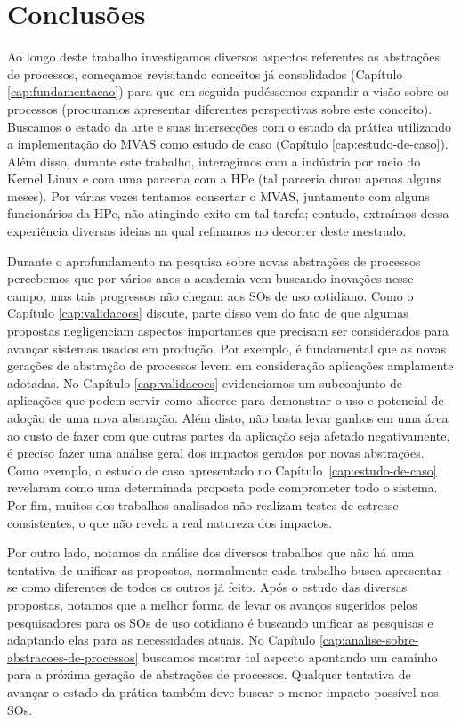 \chapter{Conclusões}
\label{cap:conclusoes}

Ao longo deste trabalho investigamos diversos aspectos referentes as abstrações
de processos, começamos revisitando conceitos já consolidados (Capítulo
\ref{cap:fundamentacao}) para que em seguida pudéssemos expandir a visão sobre
os processos (procuramos apresentar diferentes perspectivas sobre este conceito).
Buscamos o estado da arte e suas intersecções com o estado da prática
utilizando a implementação do MVAS como estudo de caso (Capítulo
\ref{cap:estudo-de-caso}). Além disso, durante este trabalho, interagimos com a
indústria por meio do Kernel Linux e com uma parceria com a HPe (tal parceria
durou apenas alguns meses). Por várias vezes tentamos consertar o MVAS,
juntamente com alguns funcionários da HPe, não atingindo exito em tal tarefa;
contudo, extraímos dessa experiência diversas ideias na qual refinamos
no decorrer deste mestrado.

Durante o aprofundamento na pesquisa sobre novas abstrações de processos
percebemos que por vários anos a academia vem buscando inovações nesse campo,
mas tais progressos não chegam aos SOs de uso cotidiano. Como o Capítulo
\ref{cap:validacoes} discute, parte disso vem do fato de que algumas propostas
negligenciam aspectos importantes que precisam ser considerados para avançar
sistemas usados em produção. Por exemplo, é fundamental que as novas gerações
de abstração de processos levem em consideração aplicações amplamente adotadas.
No Capítulo \ref{cap:validacoes} evidenciamos um subconjunto de aplicações que
podem servir como alicerce para demonstrar o uso e potencial de adoção de uma
nova abstração. Além disto, não basta levar ganhos em uma área ao custo de
fazer com que outras partes da aplicação seja afetado negativamente, é preciso
fazer uma análise geral dos impactos gerados por novas abstrações. Como
exemplo, o estudo de caso apresentado no Capítulo~\ref{cap:estudo-de-caso}
revelaram como uma determinada proposta pode comprometer todo o sistema. Por
fim, muitos dos trabalhos analisados não realizam testes de estresse
consistentes, o que não revela a real natureza dos impactos.

Por outro lado, notamos da análise dos diversos trabalhos que não há uma
tentativa de unificar as propostas, normalmente cada trabalho busca
apresentar-se como diferentes de todos os outros já feito. Após o estudo das
diversas propostas, notamos que a melhor forma de levar os avanços sugeridos
pelos pesquisadores para os SOs de uso cotidiano é buscando unificar as
pesquisas e adaptando elas para as necessidades atuais. No Capítulo
\ref{cap:analise-sobre-abstracoes-de-processos} buscamos mostrar tal aspecto
apontando um caminho para a próxima geração de abstrações de processos.
Qualquer tentativa de avançar o estado da prática também deve buscar o menor
impacto possível nos SOs.


